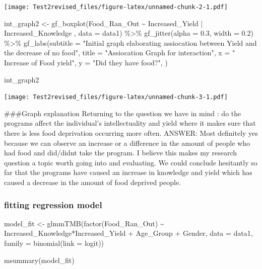 \documentclass[
]{article}
\newenvironment{Shaded}{\begin{snugshade}}{\end{snugshade}}
\newcommand{\AttributeTok}[1]{\textcolor[rgb]{0.77,0.63,0.00}{#1}}
\newcommand{\FloatTok}[1]{\textcolor[rgb]{0.00,0.00,0.81}{#1}}
\newcommand{\FunctionTok}[1]{\textcolor[rgb]{0.00,0.00,0.00}{#1}}
\newcommand{\NormalTok}[1]{#1}
\newcommand{\OtherTok}[1]{\textcolor[rgb]{0.56,0.35,0.01}{#1}}
\newcommand{\SpecialCharTok}[1]{\textcolor[rgb]{0.00,0.00,0.00}{#1}}
\newcommand{\StringTok}[1]{\textcolor[rgb]{0.31,0.60,0.02}{#1}}
\begin{document}
\texttt{[image: Test2revised\_files/figure-latex/unnamed-chunk-2-1.pdf]}

\begin{Shaded}
\begin{Highlighting}[]
\NormalTok{int\_graph2 }\OtherTok{\textless{}{-}} \FunctionTok{gf\_boxplot}\NormalTok{(Food\_Ran\_Out }\SpecialCharTok{\textasciitilde{}}\NormalTok{ Increased\_Yield }\SpecialCharTok{|}\NormalTok{ Increased\_Knowledge ,  }\AttributeTok{data =}\NormalTok{ data1) }\SpecialCharTok{\%\textgreater{}\%}
  \FunctionTok{gf\_jitter}\NormalTok{(}\AttributeTok{alpha =} \FloatTok{0.3}\NormalTok{, }\AttributeTok{width =} \FloatTok{0.2}\NormalTok{) }\SpecialCharTok{\%\textgreater{}\%}
   \FunctionTok{gf\_labs}\NormalTok{(}\AttributeTok{subtitle =} \StringTok{"Initial graph elaborating assiocation between Yield and the decrease of no food"}\NormalTok{,}
          \AttributeTok{title =} \StringTok{"Assiocation Graph for interaction"}\NormalTok{,}
          \AttributeTok{x =} \StringTok{" Increase of Food yield"}\NormalTok{,}
          \AttributeTok{y =} \StringTok{"Did they have food?"}\NormalTok{, }
\NormalTok{           )}

\NormalTok{int\_graph2}
\end{Highlighting}
\end{Shaded}

\texttt{[image: Test2revised\_files/figure-latex/unnamed-chunk-3-1.pdf]}

\#\#\#Graph explanation Returning to the question we have in mind : do
the programs affect the individual's intellectuality and yield where it
makes sure that there is less food deprivation occurring more often.
ANSWER: Most definitely yes because we can observe an increase or a
difference in the amount of people who had food and did/didnt take the
program. I believe this makes my research question a topic worth going
into and evaluating. We could conclude hesitantly so far that the
programs have caused an increase in knowledge and yield which has caused
a decrease in the amount of food deprived people.

\hypertarget{fitting-regression-model}{%
\subsubsection{fitting regression
model}\label{fitting-regression-model}}

\begin{Shaded}
\begin{Highlighting}[]
\NormalTok{model\_fit }\OtherTok{\textless{}{-}} \FunctionTok{glmmTMB}\NormalTok{(}\FunctionTok{factor}\NormalTok{(Food\_Ran\_Out) }\SpecialCharTok{\textasciitilde{}}\NormalTok{ Increased\_Knowledge}\SpecialCharTok{*}\NormalTok{Increased\_Yield }\SpecialCharTok{+}\NormalTok{ Age\_Group }\SpecialCharTok{+}\NormalTok{ Gender, }
                 \AttributeTok{data =}\NormalTok{ data1, }
                 \AttributeTok{family =} \FunctionTok{binomial}\NormalTok{(}\AttributeTok{link =} \StringTok{\textquotesingle{}logit\textquotesingle{}}\NormalTok{))}


\FunctionTok{msummary}\NormalTok{(model\_fit)}
\end{Highlighting}
\end{Shaded}
\end{document}
